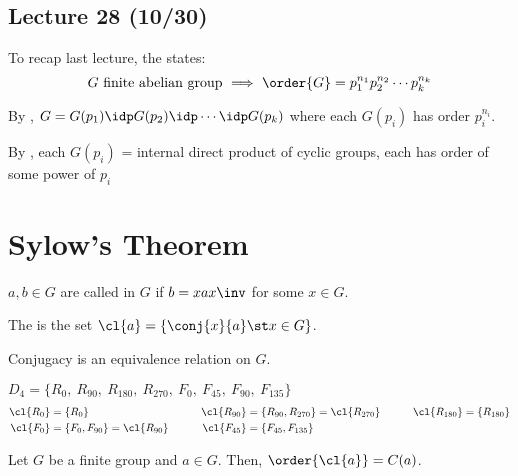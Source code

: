 \subsection*{Lecture 28 (10/30)} %

To recap last lecture, the  states:
\[\text{\(G\) finite abelian group \(\implies\) \(\order{G} = p_1^{n_1}p_2^{n_2}\cdots p_k^{n_k}\)}\]

By , \(G = G(p_1) \idp G(p_2) \idp \cdots \idp G(p_k)\) where each \(G(p_i)\) has order \(p_i^{n_i}\).

By , each \(G(p_i)\) = internal direct product of cyclic groups, each has order of some power of \(p_i\)

\setcounter{section}{23}
\section{Sylow's Theorem}

\begin{definition}

    \(a,b\in G\) are called  in \(G\) if \(b=xax\inv\) for some \(x\in G\).

    The  is the set \(\cl{a} = \{\conj{x}{a} \st x\in G\}\).
\end{definition}

\begin{remark}
    Conjugacy is an equivalence relation on \(G\).
\end{remark}

\begin{example}
    \(D_4 = \{ R_{0},\  R_{90},\  R_{180},\  R_{270},\  F_{0},\  F_{45},\ F_{90},\ F_{135} \}\)
    \begin{align*}
        \cl{R_{0}} &= \{R_{0}\} \qquad & \cl{R_{90}}&=\{R_{90}, R_{270}\} = \cl{R_{270}} \qquad & \cl{R_{180}} &= \{R_{180}\} \\
            \cl{F_{0}} &= \{F_{0}, F_{90}\} = \cl{R_{90}} \qquad & \cl{F_{45}} &= \{F_{45}, F_{135}\}
    \end{align*}
\end{example}

\begin{theorem}[24.1]
    Let \(G\) be a finite group and \(a\in G\). Then, \(\order{\cl{a}}=\index{G}{C(a)}\).
\end{theorem}

